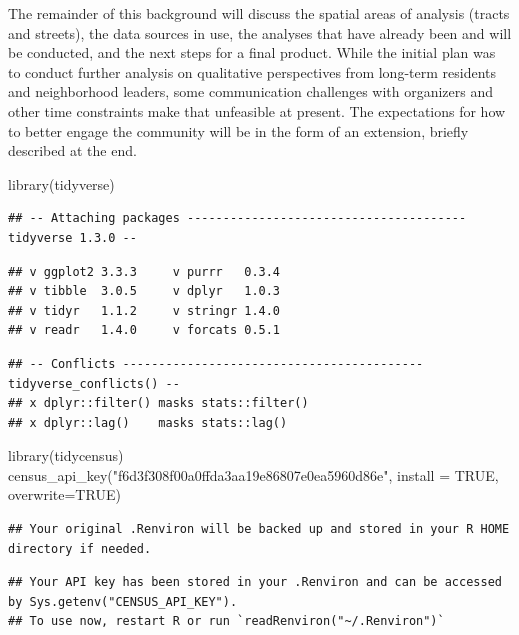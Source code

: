 \documentclass[
]{article}
\newenvironment{Shaded}{\begin{snugshade}}{\end{snugshade}}
\newcommand{\AttributeTok}[1]{\textcolor[rgb]{0.77,0.63,0.00}{#1}}
\newcommand{\ConstantTok}[1]{\textcolor[rgb]{0.00,0.00,0.00}{#1}}
\newcommand{\FunctionTok}[1]{\textcolor[rgb]{0.00,0.00,0.00}{#1}}
\newcommand{\NormalTok}[1]{#1}
\newcommand{\StringTok}[1]{\textcolor[rgb]{0.31,0.60,0.02}{#1}}
\begin{document}
The remainder of this background will discuss the spatial areas of
analysis (tracts and streets), the data sources in use, the analyses
that have already been and will be conducted, and the next steps for a
final product. While the initial plan was to conduct further analysis on
qualitative perspectives from long-term residents and neighborhood
leaders, some communication challenges with organizers and other time
constraints make that unfeasible at present. The expectations for how to
better engage the community will be in the form of an extension, briefly
described at the end.

\begin{Shaded}
\begin{Highlighting}[]
\FunctionTok{library}\NormalTok{(tidyverse)}
\end{Highlighting}
\end{Shaded}

\begin{verbatim}
## -- Attaching packages --------------------------------------- tidyverse 1.3.0 --
\end{verbatim}

\begin{verbatim}
## v ggplot2 3.3.3     v purrr   0.3.4
## v tibble  3.0.5     v dplyr   1.0.3
## v tidyr   1.1.2     v stringr 1.4.0
## v readr   1.4.0     v forcats 0.5.1
\end{verbatim}

\begin{verbatim}
## -- Conflicts ------------------------------------------ tidyverse_conflicts() --
## x dplyr::filter() masks stats::filter()
## x dplyr::lag()    masks stats::lag()
\end{verbatim}

\begin{Shaded}
\begin{Highlighting}[]
\FunctionTok{library}\NormalTok{(tidycensus)}
\FunctionTok{census\_api\_key}\NormalTok{(}\StringTok{"f6d3f308f00a0ffda3aa19e86807e0ea5960d86e"}\NormalTok{, }\AttributeTok{install =} \ConstantTok{TRUE}\NormalTok{, }\AttributeTok{overwrite=}\ConstantTok{TRUE}\NormalTok{) }
\end{Highlighting}
\end{Shaded}

\begin{verbatim}
## Your original .Renviron will be backed up and stored in your R HOME directory if needed.
\end{verbatim}

\begin{verbatim}
## Your API key has been stored in your .Renviron and can be accessed by Sys.getenv("CENSUS_API_KEY"). 
## To use now, restart R or run `readRenviron("~/.Renviron")`
\end{verbatim}
\end{document}
